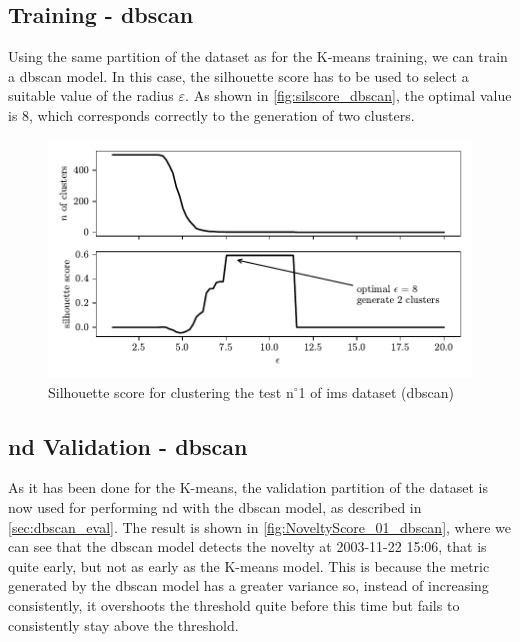 \subsection{Training - \gls{dbscan}}
Using the same partition of the dataset as for the K-means training, we can train a \gls{dbscan} model. In this case, the silhouette score has to be used to select a suitable value of the radius $\varepsilon$. As shown in \autoref{fig:silscore_dbscan}, the optimal value is 8, which corresponds correctly to the generation of two clusters.

\begin{figure}
    \centering
    \includegraphics{images/IMS/InertiaScore_01_dbscan.pdf}
    \caption{Silhouette score for clustering the test $\text{n}^\circ$1 of \gls{ims} dataset (\gls{dbscan})}
    \label{fig:silscore_dbscan}
\end{figure}

\subsection{\gls{nd} Validation - \gls{dbscan}}
As it has been done for the K-means, the validation partition of the dataset is now used for performing \gls{nd} with the \gls{dbscan} model, as described in \autoref{sec:dbscan_eval}. The result is shown in \autoref{fig:NoveltyScore_01_dbscan}, where we can see that the \gls{dbscan} model detects the novelty at 2003-11-22 15:06, that is quite early, but not as early as the K-means model. This is because the metric generated by the \gls{dbscan} model has a greater variance so, instead of increasing consistently, it overshoots the threshold quite before this time but fails to consistently stay above the threshold. 

